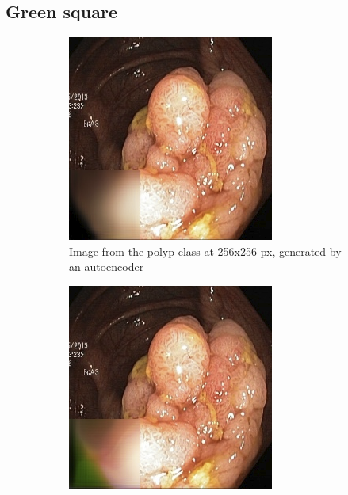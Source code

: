 \subsection{Green square}
        \begin{figure}[t]
        \centering
        \begin{subfigure}[b]{0.4\textwidth}
            \centering
            \includegraphics[width=\textwidth]{experiments/figures/greensquare/polypAE.png}
            \caption[Is this in use]%
            {{\small Image from the polyp class at 256x256 px, generated by an autoencoder }}    
            \label{fig:polypAEGREEN}
        \end{subfigure}
        \qquad
        \begin{subfigure}[b]{0.4\textwidth}  
            \centering 
            \includegraphics[width=\textwidth]{experiments/figures/greensquare/polypGAN.png}

\end{subfigure}
\end{figure}
